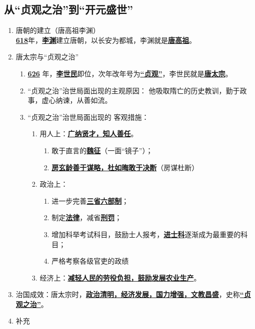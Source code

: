 \documentclass[12pt, a4paper, oneside]{ctexart}
\begin{document}
		\subsection{从“贞观之治”到“开元盛世”}
		\begin{enumerate}
			\item 唐朝的建立（唐高祖李渊）\\ \underline{\textbf{618}}年，\underline{\textbf{李渊}}建立唐朝，以长安为都城，李渊就是\underline{\textbf{唐高祖}}。
			\item 唐太宗与“贞观之治”
				\begin{enumerate}
					\item \underline{\textbf{626}} 年，\underline{\textbf{李世民}}即位，次年改年号为\underline{\textbf{“贞观”}}，李世民就是\underline{\textbf{唐太宗}}。
					\item “贞观之治”治世局面出现的主观原因：
							他吸取隋亡的历史教训，勤于政事，虚心纳谏，从善如流。
					\item“贞观之治”治世局面出现的 客观措施：
						\begin{enumerate}
							\item 用人上：\underline{\textbf{广纳贤才，知人善任}}。
							\begin{enumerate}
								\item 敢于直言的\underline{\textbf{魏征}}（一面“镜子”）；
								\item \underline{\textbf{房玄龄善于谋略，杜如晦敢于决断}}（房谋杜断）
							\end{enumerate}
							\item 政治上：
							\begin{enumerate}
								\item 进一步完善\underline{\textbf{三省六部制}}；
								\item 制定\underline{\textbf{法律}}，减省\underline{\textbf{刑罚}}；
								\item 增加科举考试科目，鼓励士人报考，\underline{\textbf{进士科}}逐渐成为最重要的科目；
								\item 严格考察各级官吏的政绩
							\end{enumerate}
							\item 经济上：\underline{\textbf{减轻人民的劳役负担，鼓励发展农业生产}}。
						\end{enumerate}
				\end{enumerate}
				\item 治国成效：唐太宗时，\underline{\textbf{政治清明，经济发展，国力增强，文教昌盛}}，史称\underline{\textbf{“贞观之治”}}。
				\item 补充

\end{enumerate}
\end{document}

